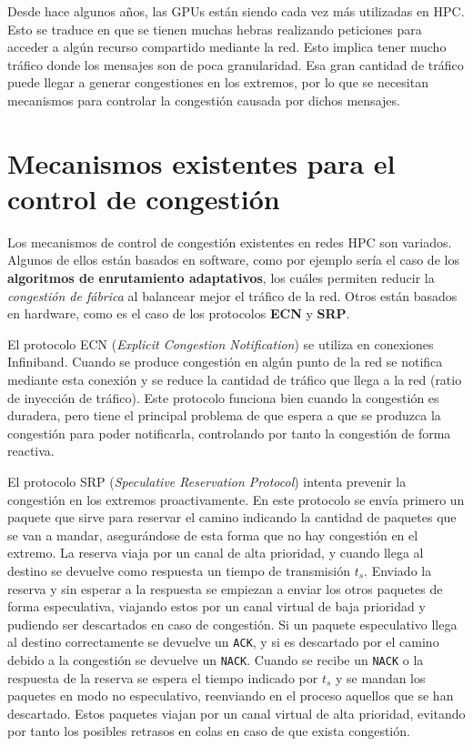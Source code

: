 \documentclass[11pt,a4paper]{article}
\begin{document}
Desde hace algunos años, las GPUs están siendo cada vez más utilizadas en HPC. Esto se traduce
en que se tienen muchas hebras realizando peticiones para acceder a algún recurso compartido
mediante la red. Esto implica tener mucho tráfico donde los mensajes son de poca granularidad.
Esa gran cantidad de tráfico puede llegar a generar congestiones en los extremos, por lo que se
necesitan mecanismos para controlar la congestión causada por dichos mensajes.

\section{Mecanismos existentes para el control de congestión}

Los mecanismos de control de congestión existentes en redes HPC son variados. Algunos de
ellos están basados en software, como por ejemplo sería el caso de los
\textbf{algoritmos de enrutamiento adaptativos}, los cuáles permiten reducir la
\textit{congestión de fábrica} al balancear mejor el tráfico de la red. Otros están
basados en hardware, como es el caso de los protocolos \textbf{ECN} y \textbf{SRP}.

El protocolo ECN (\textit{Explicit Congestion Notification}) se utiliza en conexiones
Infiniband. Cuando se produce congestión en algún punto de la red se notifica mediante
esta conexión y se reduce la cantidad de tráfico que llega a la red (ratio de inyección de
tráfico). Este protocolo funciona bien cuando la congestión es duradera, pero tiene el
principal problema de que espera a que se produzca la congestión para poder notificarla,
controlando por tanto la congestión de forma reactiva.

El protocolo SRP (\textit{Speculative Reservation Protocol}) intenta prevenir la congestión
en los extremos proactivamente. En este protocolo se envía primero un paquete que sirve
para reservar el camino indicando la cantidad de paquetes que se van a mandar, asegurándose
de esta forma que no hay congestión en el extremo. La reserva viaja por un canal de alta
prioridad, y cuando llega al destino se devuelve como respuesta un tiempo de transmisión $t_s$.
Enviado la reserva y sin esperar a la respuesta se empiezan a enviar los otros paquetes de forma
especulativa, viajando estos por un canal virtual de baja prioridad y pudiendo ser descartados
en caso de congestión. Si un paquete especulativo llega al destino correctamente se devuelve
un \texttt{ACK}, y si es descartado por el camino debido a la congestión se devuelve un
\texttt{NACK}. Cuando se recibe un \texttt{NACK} o la respuesta de la reserva se espera el tiempo
indicado por $t_s$ y se mandan los paquetes en modo no especulativo, reenviando en el proceso
aquellos que se han descartado. Estos paquetes viajan por un canal virtual de alta prioridad,
evitando por tanto los posibles retrasos en colas en caso de que exista congestión.
\end{document}
